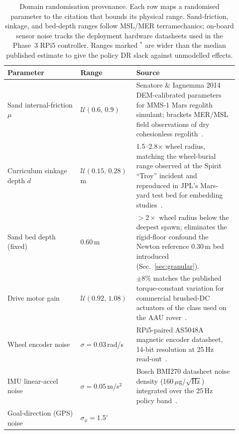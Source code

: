 \documentclass[conference]{IEEEtran}
\begin{document}
\begin{table}[!htbp]
  \centering
  \caption{Domain randomisation provenance. Each row maps a randomised
    parameter to the citation that bounds its physical range. Sand-friction,
    sinkage, and bed-depth ranges follow MSL/MER terramechanics; on-board
    sensor noise tracks the deployment hardware datasheets used in the Phase~3
    RPi5 controller. Ranges marked $^*$ are wider than the median published
    estimate to give the policy DR slack against unmodelled effects.}
  \label{tab:dr_provenance}
  \renewcommand{\arraystretch}{1.18}
  \footnotesize
  \begin{tabular}{@{}p{0.30\linewidth} p{0.20\linewidth} p{0.42\linewidth}@{}}
    \toprule
    \textbf{Parameter} & \textbf{Range} & \textbf{Source} \\
    \midrule
    Sand internal-friction $\mu$
      & $\mathcal{U}(0.6,\,0.9)$
      & Senatore \& Iagnemma 2014 DEM-calibrated parameters for MMS-1 Mars
        regolith simulant; brackets MER/MSL field observations of dry
        cohesionless regolith~\cite{senatore_iagnemma2014}. \\
    Curriculum sinkage depth $d$
      & $\mathcal{U}(0.15,\,0.28)$\,m
      & 1.5--2.8$\times$ wheel radius, matching the wheel-burial range
        observed at the Spirit ``Troy'' incident and reproduced in JPL's
        Mars-yard test bed for embedding studies~\cite{arvidson2010,
        ono2018msl_mobility}. \\
    Sand bed depth (fixed)
      & 0.60\,m
      & $>2\times$ wheel radius below the deepest spawn; eliminates the
        rigid-floor confound the Newton reference 0.30\,m bed introduced
        (Sec.~\ref{sec:granular}). \\
    Drive motor gain
      & $\mathcal{U}(0.92,\,1.08)$
      & $\pm8\%$ matches the published torque-constant variation for
        commercial brushed-DC actuators of the class used on the AAU
        rover~\cite{maxon_re_datasheet}. \\
    Wheel encoder noise
      & $\sigma{=}0.03$\,rad/s
      & RPi5-paired AS5048A magnetic encoder datasheet, 14-bit
        resolution at 25\,Hz read-out~\cite{as5048a_datasheet}. \\
    IMU linear-accel noise
      & $\sigma{=}0.05$\,m/s$^2$
      & Bosch BMI270 datasheet noise density (160\,$\mu$g/$\sqrt{\text{Hz}}$)
        integrated over the 25\,Hz policy band~\cite{bmi270_datasheet}. \\
    Goal-direction (GPS) noise
      & $\sigma_{\phi}{=}1.5^{\circ}$

\end{tabular}
\end{table}
\end{document}
